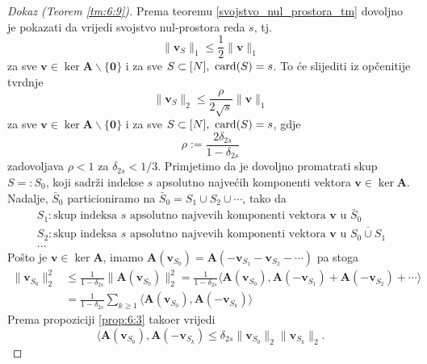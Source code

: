 \documentclass[a4paper,twoside,12pt]{memoir} %
\newcommand{\vect}[1]{\mathbf{#1}}
\renewcommand{\vec}{\vect}
\newcommand{\card}{\text{\normalfont{card}}}
\newcommand{\norm}[1]{\|{#1}\|}
\begin{document}
\begin{proof}[Dokaz (Teorem \ref{tm:6:9})]
    Prema teoremu \ref{svojstvo_nul_prostora_tm} dovoljno je pokazati da vrijedi svojstvo nul-prostora reda $s$, tj.
    \begin{equation*}
        \norm{\vec v_S}_1 \leq \frac{1}{2} \norm{\vec v}_1     
    \end{equation*}
    za sve $\vec v \in \ker \vec A \backslash \{\vec 0\}$ i za sve $S \subset [N],\  \card(S) = s$. To \'ce slijediti iz op\v{c}enitije tvrdnje  
    \begin{equation*}
        \norm{\vec v_S}_2 \leq \frac{\rho}{2 \sqrt{s}} \norm{\vec v}_1     
    \end{equation*}
    za sve $\vec v \in \ker \vec A \backslash \{\vec 0\}$ i za sve $S \subset [N],\  \card(S) = s$, gdje
    \begin{equation*}
        \rho := \frac{2 \delta_{2s}}{1 - \delta_{2s}}  
    \end{equation*}
    zadovoljava $\rho < 1$ za $\delta_{2s} < 1/3$.
    Primjetimo da je dovoljno promatrati skup $S =: S_0$, koji sadr\v{z}i indekse $s$ apsolutno najve\'cih komponenti vektora $\vec v \in \ker \vec A$. Nadalje, $\bar S_0$ particioniramo na $\bar S_0 = S_1 \cup S_2 \cup \cdots$, tako da
    \begin{align*}
       &S_1: \text{skup indeksa $s$ apsolutno najve\'vih komponenti vektora $\vec v$ u $\bar S_0$}\\ 
       &S_2: \text{skup indeksa $s$ apsolutno najve\'vih komponenti vektora $\vec v$ u $\overline{S_0 \cup S_1}$ }\\
       &...
    \end{align*}
    Po\v{s}to je $\vec v \in \ker \vec A$, imamo $\vec A(\vec v_{S_0}) = \vec A(-\vec v_{S_1} - \vec v_{S_2} - \cdots)$ pa stoga
    \begin{align}
        \norm{\vec v_{S_0}}^2_2 &\leq \frac{1}{1- \delta_{2s}} \norm{\vec A(\vec v_{S_0})}^2_2 = \frac{1}{1-\delta_{2s}} \langle \vec A(\vec v_{S_0}), \vec A(-\vec v_{S_1}) + \vec A (- \vec v_{S_2}) + \cdots \rangle \nonumber \\
        &= \frac{1}{1-\delta_{2s}} \sum_{k \geq 1} \langle \vec A(\vec v_{S_0}), \vec A (- \vec v_{S_k}) \rangle \label{6:18}
    \end{align}
    Prema propoziciji \ref{prop:6:3} tako\dj er vrijedi
    \begin{equation}\label{6:19}
        \langle \vec A (\vec v_{S_0}), \vec A (-\vec v_{S_k})  \leq \delta_{2s} \norm{\vec v_{S_0}}_2 \norm{\vec v_{S_k}}_2.

\end{equation}
\end{proof}
\end{document}
